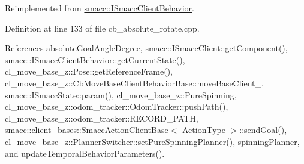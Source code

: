 Reimplemented from \hyperlink{classsmacc_1_1ISmaccClientBehavior_a3ec24a839087c550e1d62a81e48cf530}{smacc\+::\+I\+Smacc\+Client\+Behavior}.



Definition at line 133 of file cb\+\_\+absolute\+\_\+rotate.\+cpp.



References absolute\+Goal\+Angle\+Degree, smacc\+::\+I\+Smacc\+Client\+::get\+Component(), smacc\+::\+I\+Smacc\+Client\+Behavior\+::get\+Current\+State(), cl\+\_\+move\+\_\+base\+\_\+z\+::\+Pose\+::get\+Reference\+Frame(), cl\+\_\+move\+\_\+base\+\_\+z\+::\+Cb\+Move\+Base\+Client\+Behavior\+Base\+::move\+Base\+Client\+\_\+, smacc\+::\+I\+Smacc\+State\+::param(), cl\+\_\+move\+\_\+base\+\_\+z\+::\+Pure\+Spinning, cl\+\_\+move\+\_\+base\+\_\+z\+::odom\+\_\+tracker\+::\+Odom\+Tracker\+::push\+Path(), cl\+\_\+move\+\_\+base\+\_\+z\+::odom\+\_\+tracker\+::\+R\+E\+C\+O\+R\+D\+\_\+\+P\+A\+TH, smacc\+::client\+\_\+bases\+::\+Smacc\+Action\+Client\+Base$<$ Action\+Type $>$\+::send\+Goal(), cl\+\_\+move\+\_\+base\+\_\+z\+::\+Planner\+Switcher\+::set\+Pure\+Spinning\+Planner(), spinning\+Planner, and update\+Temporal\+Behavior\+Parameters().


